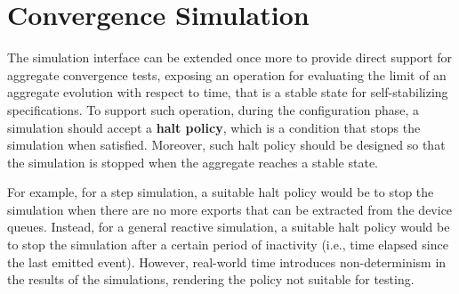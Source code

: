 
\section{Convergence Simulation}
\label{section:design:convergence-simulation}

The simulation interface can be extended once more to provide direct support
for aggregate convergence tests, exposing an operation for evaluating the limit
of an aggregate evolution with respect to time, that is a stable state for
self-stabilizing specifications. To support such operation, during the
configuration phase, a simulation should accept a \textbf{halt policy}, which
is a condition that stops the simulation when satisfied. Moreover, such halt
policy should be designed so that the simulation is stopped when the aggregate
reaches a stable state.

For example, for a step simulation, a suitable halt policy would be to stop the
simulation when there are no more exports that can be extracted from the device
queues. Instead, for a general reactive simulation, a suitable halt policy
would be to stop the simulation after a certain period of inactivity (i.e.,
time elapsed since the last emitted event). However, real-world time introduces
non-determinism in the results of the simulations, rendering the policy not
suitable for testing.
